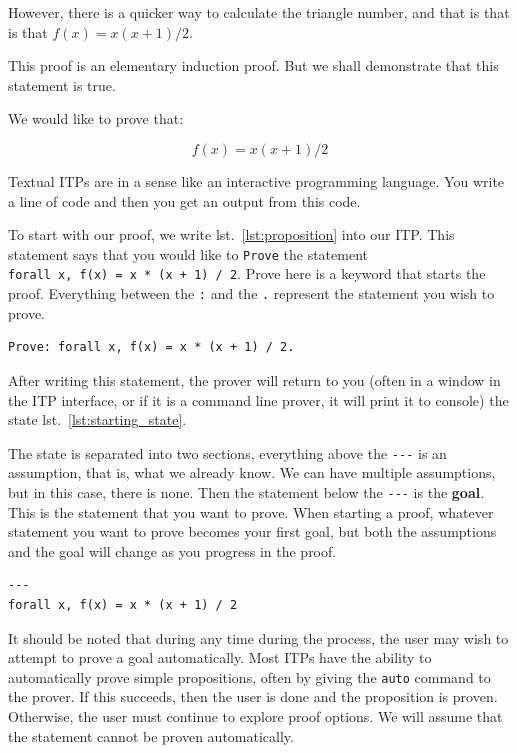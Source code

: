 \documentclass[
]{article}
\begin{document}
However, there is a quicker way to calculate the triangle number, and
that is that is that \(f(x) = x(x + 1) / 2\).

This proof is an elementary induction proof. But we shall demonstrate
that this statement is true.

We would like to prove that:

\[ f(x) = x(x + 1)/2 \]

Textual ITPs are in a sense like an interactive programming language.
You write a line of code and then you get an output from this code.

To start with our proof, we write lst.~\ref{lst:proposition} into our
ITP. This statement says that you would like to \texttt{Prove} the
statement \texttt{forall\ x,\ f(x)\ =\ x\ *\ (x\ +\ 1)\ /\ 2}. Prove
here is a keyword that starts the proof. Everything between the
\texttt{:} and the \texttt{.} represent the statement you wish to prove.

\hypertarget{lst:proposition}{%
\label{lst:proposition}}%
\begin{verbatim}
Prove: forall x, f(x) = x * (x + 1) / 2.
\end{verbatim}

After writing this statement, the prover will return to you (often in a
window in the ITP interface, or if it is a command line prover, it will
print it to console) the state lst.~\ref{lst:starting_state}.

The state is separated into two sections, everything above the
\texttt{-\/-\/-} is an assumption, that is, what we already know. We can
have multiple assumptions, but in this case, there is none. Then the
statement below the \texttt{-\/-\/-} is the \textbf{goal}. This is the
statement that you want to prove. When starting a proof, whatever
statement you want to prove becomes your first goal, but both the
assumptions and the goal will change as you progress in the proof.

\hypertarget{lst:starting_state}{%
\label{lst:starting_state}}%
\begin{verbatim}
---
forall x, f(x) = x * (x + 1) / 2
\end{verbatim}

It should be noted that during any time during the process, the user may
wish to attempt to prove a goal automatically. Most ITPs have the
ability to automatically prove simple propositions, often by giving the
\texttt{auto} command to the prover. If this succeeds, then the user is
done and the proposition is proven. Otherwise, the user must continue to
explore proof options. We will assume that the statement cannot be
proven automatically.
\end{document}
